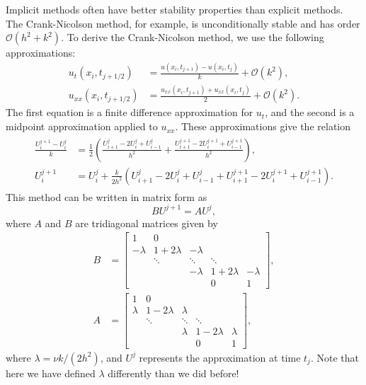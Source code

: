 Implicit methods often have better stability properties than explicit methods.
The Crank-Nicolson method, for example, is unconditionally stable and has order $\mathcal{O}(h^2 + k^2)$.
To derive the Crank-Nicolson method, we use the following approximations:
\begin{align*}
	u_t(x_i,t_{j+1/2}) &= \frac{u(x_i,t_{j+1}) - u(x_i,t_j)}{k} + \mathcal{O}(k^2), \\
	u_{xx}(x_i,t_{j+1/2}) &= \frac{u_{xx}(x_i,t_{j+1}) + u_{xx}(x_i,t_j)}{2} + \mathcal{O}(k^2).
\end{align*}
The first equation is a finite difference approximation for \(u_t\), and the second is a midpoint approximation applied to \(u_{xx}\). 
These approximations give the relation
\begin{align}
	\begin{split}
	\frac{U^{j+1}_i - U^j_i}{k} &= \frac{1}{2}\left( \frac{U^j_{i+1} - 2U^j_{i} + U^j_{i-1}}{h^2} + \frac{U^{j+1}_{i+1} - 2U^{j+1}_{i} + U^{j+1}_{i-1}}{h^2}  \right) ,\\
	U^{j+1}_i  &= U^j_i + \frac{k}{2h^2} \left( U^j_{i+1} - 2U^j_{i} + U^j_{i-1} + U^{j+1}_{i+1} - 2U^{j+1}_{i} + U^{j+1}_{i-1}   \right).
\end{split}
\end{align}
This method can be written in matrix form as
\[BU^{j+1} = A U^j,\]
where $A$ and $B$ are tridiagonal matrices given by
\begin{align*}
B &= \left[\begin{array}{cccccc}1 & 0 &  &  &  \\ -\lambda & 1+2\lambda &  -\lambda & &  \\ &  \ddots &   \ddots & \ddots \\ & &  -\lambda &  1+2\lambda & -\lambda \\ &  &  & 0 & 1\end{array}\right], \\
A &= \left[\begin{array}{cccccc}1 & 0 &  &  &  \\ \lambda & 1-2\lambda &  \lambda & &  \\ &  \ddots &   \ddots & \ddots \\ & &  \lambda &  1-2\lambda & \lambda \\ &  &  & 0 & 1\end{array}\right],
\end{align*}
where $\lambda = \nu k/(2h^2)$, and $U^j$ represents the approximation at time $t_j$.
Note that here we have defined $\lambda$ differently than we did before!

